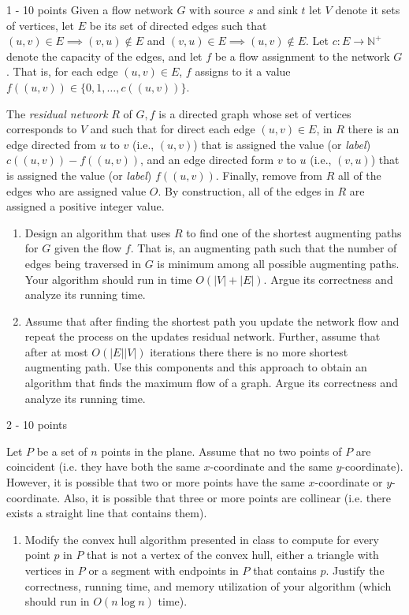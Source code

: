 \documentclass{common/cs157}
\begin{document}
\begin{problem}{1 - 10 points}
Given a flow network $G$ with source $s$ and sink $t$ let $V$ denote it sets of vertices, let $E$ be its set of directed edges such that $(u,v)\in E \implies (v,u)\notin E$ and $(v,u)\in E \implies (u,v)\notin E$. Let $c:E\rightarrow\mathbb{N}^+$ denote the capacity of the edges, and let $f$ be a flow assignment to the network $G$. That is, for each edge $(u,v)\in E$, $f$ assigns to it a value $f((u,v))\in \{0,1,\ldots, c((u,v))\}$. 

The \emph{residual network} $R$ of $G,f$ is a directed graph whose set of vertices corresponds to $V$ and such that for direct each edge $(u,v)\in E$, in $R$ there is an edge directed from $u$ to $v$ (i.e., $(u,v)$) that is assigned the value (or \emph{label}) $c((u,v))-f((u,v))$, and an edge directed form $v$ to $u$ (i.e., $(v,u)$) that is assigned the value (or \emph{label}) $f((u,v))$. Finally, remove from $R$ all of the edges who are assigned value $O$. 
By construction, all of the edges in $R$ are assigned a positive integer value. 
\begin{enumerate}
    \item Design an algorithm that uses $R$ to find one of the shortest augmenting paths for $G$ given the flow $f$. That is, an augmenting path such that the number of edges being traversed in $G$ is minimum among all possible augmenting paths. Your algorithm should run in time $O(|V|+|E|)$. Argue its correctness and analyze its running time. 
    \item Assume that after finding the shortest path you update the network flow and repeat the process on the updates residual network. Further, assume that after at most $O(|E||V|)$ iterations there there is no more shortest augmenting path. Use this components and this approach to obtain an algorithm that finds the maximum flow of a graph. Argue its correctness and analyze its running time.  
\end{enumerate}

\end{problem}
\newpage
\begin{problem}{2 - 10 points}

Let $P$ be a set of $n$ points in the plane. Assume that no two points of $P$ are coincident (i.e. they have both the same $x$-coordinate and the same $y$-coordinate). However, it is possible that two or more points have the same $x$-coordinate or $y$-coordinate. Also, it is possible that three or more points are collinear (i.e. there exists a straight line that contains them).

\begin{enumerate}
    \item Modify the convex hull algorithm presented in class to compute for every point $p$ in $P$ that is not a vertex of the convex hull, either a triangle with vertices in $P$ or a segment with endpoints in $P$ that contains $p$. Justify the correctness, running time, and memory utilization of your algorithm (which should run in $O(n\log n)$ time).
\end{enumerate}
\end{problem}
\end{document}
